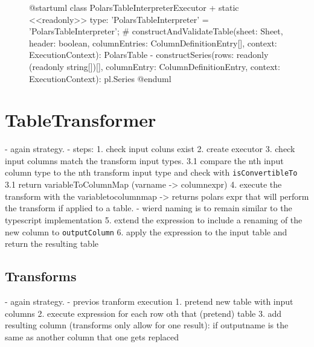 \begin{figure}
	\begin{plantuml}
		@startuml
		class PolarsTableInterpreterExecutor {
		+ {static} <<readonly>> type: 'PolarsTableInterpreter' = 'PolarsTableInterpreter';
		# constructAndValidateTable(sheet: Sheet, header: boolean, columnEntries: ColumnDefinitionEntry[], context: ExecutionContext): PolarsTable
		- constructSeries(rows: readonly (readonly string[])[], columnEntry: ColumnDefinitionEntry, context: ExecutionContext): pl.Series
		}
		@enduml
	\end{plantuml}
	\caption{}\label{fig:polarstableinterpreter_uml}
\end{figure}



\section{TableTransformer}
- again strategy.
- steps:
1. check input coluns exist
2. create executor
3. check input columns match the transform input types.
3.1 compare the nth input column type to the nth transform input type and check with \Verb|isConvertibleTo|
3.1 return variableToColumnMap (varname -> columnexpr)
4. execute the transform with the variabletocolumnmap -> returns polars expr that will perform the transform if applied to a table.
- wierd naming is to remain similar to the typescript implementation
5. extend the expression to include a renaming of the new column to \Verb|outputColumn|
6. apply the expression to the input table and return the resulting table

\subsection{Transforms}
- again strategy.
- previos tranform execution
1. pretend new table with input columns
2. execute expression for each row oth that (pretend) table
3. add resulting column (transforms only allow for one result): if outputname is the same as another column that one gets replaced


